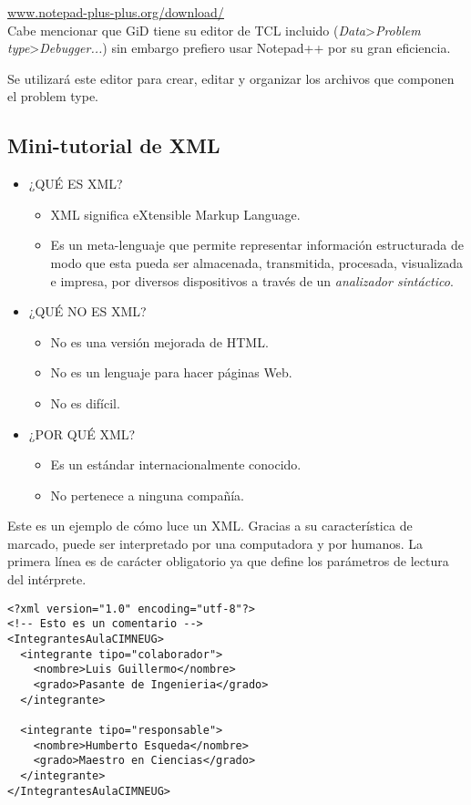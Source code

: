 \documentclass[10pt, a4paper, twocolumn]{article} %
\begin{document}
\textcolor{BlueGiD}{\underline{\url{www.notepad-plus-plus.org/download/}}}\\

Cabe mencionar que GiD tiene su editor de TCL incluido (\textit{Data}>\textit{Problem type}>\textit{Debugger...}) sin embargo prefiero usar Notepad++ por su gran eficiencia.

Se utilizará este editor para crear, editar y organizar los archivos que componen el problem type.

\subsection{Mini-tutorial de XML}

\begin{itemize}
	\item ¿QUÉ ES XML?
		\begin{itemize}
			\item XML significa eXtensible Markup Language.
			\item Es un meta-lenguaje que permite representar información estructurada de modo que esta pueda ser almacenada, transmitida, procesada, visualizada e impresa, por diversos dispositivos a través de un \textit{analizador sintáctico}.
		\end{itemize}
	\item ¿QUÉ NO ES XML?
		\begin{itemize}
			\item No es una versión mejorada de HTML.
			\item No es un lenguaje para hacer páginas Web.
			\item No es difícil.
		\end{itemize}
	\item ¿POR QUÉ XML?
		\begin{itemize}
			\item Es un estándar internacionalmente conocido.
			\item No pertenece a ninguna compañía.
		\end{itemize}
\end{itemize}

Este es un ejemplo de cómo luce un XML. Gracias a su característica de marcado, puede ser interpretado por una computadora y por humanos. La primera línea es de carácter obligatorio ya que define los parámetros de lectura del intérprete.

\lstset{language=XML} 
\begin{lstlisting}
<?xml version="1.0" encoding="utf-8"?>
<!-- Esto es un comentario -->
<IntegrantesAulaCIMNEUG>
  <integrante tipo="colaborador">
    <nombre>Luis Guillermo</nombre>
    <grado>Pasante de Ingenieria</grado> 
  </integrante>

  <integrante tipo="responsable">
    <nombre>Humberto Esqueda</nombre>
    <grado>Maestro en Ciencias</grado> 
  </integrante>
</IntegrantesAulaCIMNEUG>
\end{lstlisting}
\end{document}
